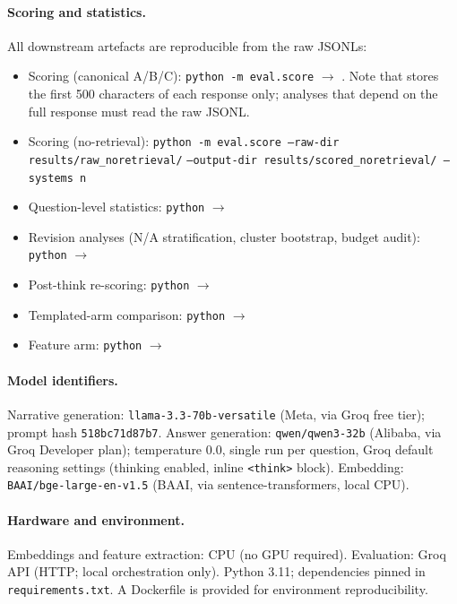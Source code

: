 \paragraph{Scoring and statistics.}
All downstream artefacts are reproducible from the raw JSONLs:
\begin{itemize}
  \item Scoring (canonical A/B/C): \texttt{python -m eval.score}
    $\rightarrow$ .  Note that  stores the
    first 500 characters of each response only; analyses that depend on the full
    response must read the raw JSONL.
  \item Scoring (no-retrieval): \texttt{python -m eval.score --raw-dir results/raw\_noretrieval/}
    \texttt{--output-dir results/scored\_noretrieval/ --systems n}
  \item Question-level statistics: \texttt{python} 
    $\rightarrow$ 
  \item Revision analyses (N/A stratification, cluster bootstrap, budget audit):
    \texttt{python} 
    $\rightarrow$ 
  \item Post-think re-scoring: \texttt{python} 
    $\rightarrow$ 
  \item Templated-arm comparison: \texttt{python} 
    $\rightarrow$ 
  \item Feature arm: \texttt{python} 
    $\rightarrow$ 
\end{itemize}

\paragraph{Model identifiers.}
Narrative generation: \texttt{llama-3.3-70b-versatile} (Meta, via Groq free tier);
prompt hash \texttt{518bc71d87b7}.
Answer generation: \texttt{qwen/qwen3-32b} (Alibaba, via Groq Developer plan);
temperature 0.0, single run per question, Groq default reasoning settings (thinking
enabled, inline \texttt{<think>} block).
Embedding: \texttt{BAAI/bge-large-en-v1.5} (BAAI, via sentence-transformers, local CPU).

\paragraph{Hardware and environment.}
Embeddings and feature extraction: CPU (no GPU required).
Evaluation: Groq API (HTTP; local orchestration only).
Python 3.11; dependencies pinned in \texttt{requirements.txt}.
A Dockerfile is provided for environment reproducibility.

